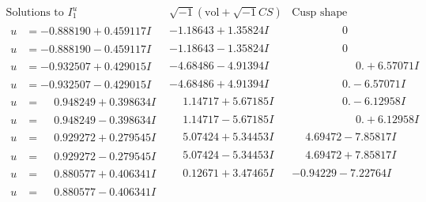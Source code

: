 \documentclass[1p]{elsarticle_modified}
\theoremstyle{definition}
\newcommand{\I}{\sqrt{-1}}
\begin{document}
$$\begin{array}{c|c|c}  
\text{Solutions to }I^u_{1}& \I (\text{vol} + \sqrt{-1}CS) & \text{Cusp shape}\\
 \hline 
\begin{aligned}
u &= -0.888190 + 0.459117 I\end{aligned}
 & -1.18643 + 1.35824 I & \phantom{-0.000000 } 0 \\ \hline\begin{aligned}
u &= -0.888190 - 0.459117 I\end{aligned}
 & -1.18643 - 1.35824 I & \phantom{-0.000000 } 0 \\ \hline\begin{aligned}
u &= -0.932507 + 0.429015 I\end{aligned}
 & -4.68486 - 4.91394 I & \phantom{-0.000000 -}0. + 6.57071 I \\ \hline\begin{aligned}
u &= -0.932507 - 0.429015 I\end{aligned}
 & -4.68486 + 4.91394 I & \phantom{-0.000000 } 0. - 6.57071 I \\ \hline\begin{aligned}
u &= \phantom{-}0.948249 + 0.398634 I\end{aligned}
 & \phantom{-}1.14717 + 5.67185 I & \phantom{-0.000000 } 0. - 6.12958 I \\ \hline\begin{aligned}
u &= \phantom{-}0.948249 - 0.398634 I\end{aligned}
 & \phantom{-}1.14717 - 5.67185 I & \phantom{-0.000000 -}0. + 6.12958 I \\ \hline\begin{aligned}
u &= \phantom{-}0.929272 + 0.279545 I\end{aligned}
 & \phantom{-}5.07424 + 5.34453 I & \phantom{-}4.69472 - 7.85817 I \\ \hline\begin{aligned}
u &= \phantom{-}0.929272 - 0.279545 I\end{aligned}
 & \phantom{-}5.07424 - 5.34453 I & \phantom{-}4.69472 + 7.85817 I \\ \hline\begin{aligned}
u &= \phantom{-}0.880577 + 0.406341 I\end{aligned}
 & \phantom{-}0.12671 + 3.47465 I & -0.94229 - 7.22764 I \\ \hline\begin{aligned}
u &= \phantom{-}0.880577 - 0.406341 I\end{aligned}

\end{array}$$
\end{document}
